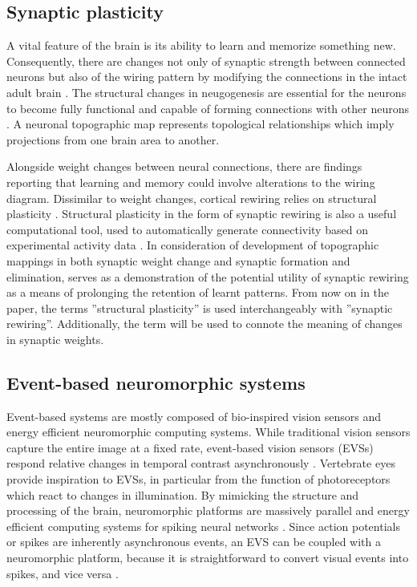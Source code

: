 \documentclass[preprint,12pt]{elsarticle}
\begin{document}
\subsection{Synaptic plasticity}

A vital feature of the brain is its ability to learn and memorize something new. 
Consequently, there are changes not only of synaptic strength between connected neurons but also of the wiring pattern by modifying the connections in the intact adult brain \cite{albieri2015rapid}.
The structural changes in neugogenesis are essential for the neurons to become fully functional and capable of forming connections with other neurons \cite{roeder2022evidence}. %
A neuronal topographic map represents topological relationships which imply projections from one brain area to another.

Alongside weight changes between neural connections, there are findings reporting that learning and memory  could involve alterations to the wiring diagram.
Dissimilar to weight changes, cortical rewiring relies on structural plasticity \cite{Chklovskii2004b}.
Structural plasticity in the form of synaptic rewiring is also a useful computational tool, used to automatically generate connectivity based on experimental activity data \cite{Diaz-Pier2016a}.
In consideration of development of topographic mappings in both synaptic weight change and synaptic formation and elimination, \cite{bamford2010synaptic} serves as a demonstration of the potential utility of synaptic rewiring as a means of prolonging the retention of learnt patterns.
From now on in the paper, the terms ''structural plasticity'' is used interchangeably with ''synaptic rewiring''.
Additionally, the term will be used to connote the meaning of changes in synaptic weights.

\subsection{Event-based neuromorphic systems}

Event-based systems are mostly composed of bio-inspired vision sensors and energy efficient neuromorphic computing systems. 
While traditional vision sensors capture the entire image at a fixed rate, event-based vision sensors (EVSs) respond relative changes in temporal contrast asynchronously \cite{Indiveri2015}.
Vertebrate eyes provide inspiration to EVSs, in particular from the function of photoreceptors which react to changes in illumination.
By mimicking the structure and processing of the brain, neuromorphic platforms are massively parallel and energy efficient computing systems for spiking neural networks \cite{janzakova2023structural}.
Since action potentials or spikes are inherently asynchronous events, an EVS can be coupled with a neuromorphic platform, because it is straightforward to convert visual events into spikes, and vice versa  \cite{Gallego2019}.
\end{document}
